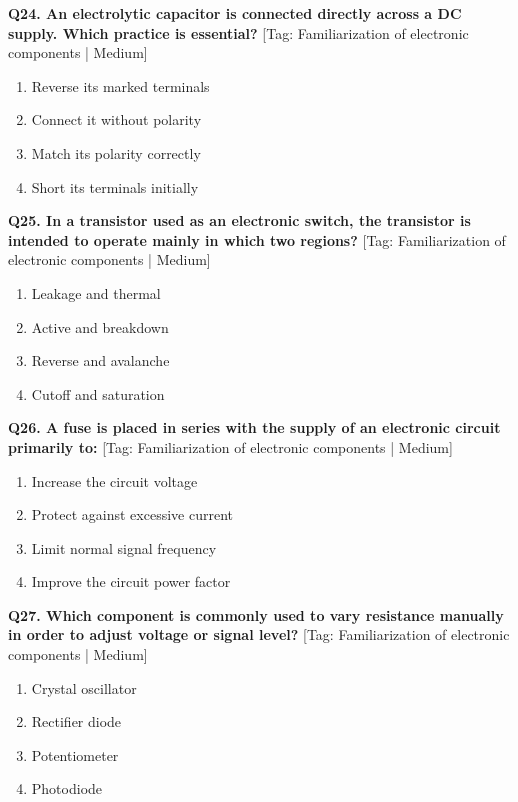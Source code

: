 \noindent\textbf{Q24. An electrolytic capacitor is connected directly across a DC supply. Which practice is essential?} \hfill [Tag: Familiarization of electronic components | Medium]
\begin{enumerate}[label=(\alph*),topsep=2pt,itemsep=1pt,partopsep=0pt,parsep=0pt]
    \item {Reverse its marked terminals}
    \item {Connect it without polarity}
    \item {Match its polarity correctly}
    \item {Short its terminals initially}
\end{enumerate}
\vspace{2mm}

\noindent\textbf{Q25. In a transistor used as an electronic switch, the transistor is intended to operate mainly in which two regions?} \hfill [Tag: Familiarization of electronic components | Medium]
\begin{enumerate}[label=(\alph*),topsep=2pt,itemsep=1pt,partopsep=0pt,parsep=0pt]
    \item {Leakage and thermal}
    \item {Active and breakdown}
    \item {Reverse and avalanche}
    \item {Cutoff and saturation}
\end{enumerate}
\vspace{2mm}

\noindent\textbf{Q26. A fuse is placed in series with the supply of an electronic circuit primarily to:} \hfill [Tag: Familiarization of electronic components | Medium]
\begin{enumerate}[label=(\alph*),topsep=2pt,itemsep=1pt,partopsep=0pt,parsep=0pt]
    \item {Increase the circuit voltage}
    \item {Protect against excessive current}
    \item {Limit normal signal frequency}
    \item {Improve the circuit power factor}
\end{enumerate}
\vspace{2mm}

\noindent\textbf{Q27. Which component is commonly used to vary resistance manually in order to adjust voltage or signal level?} \hfill [Tag: Familiarization of electronic components | Medium]
\begin{enumerate}[label=(\alph*),topsep=2pt,itemsep=1pt,partopsep=0pt,parsep=0pt]
    \item {Crystal oscillator}
    \item {Rectifier diode}
    \item {Potentiometer}
    \item {Photodiode}
\end{enumerate}
\vspace{2mm}

